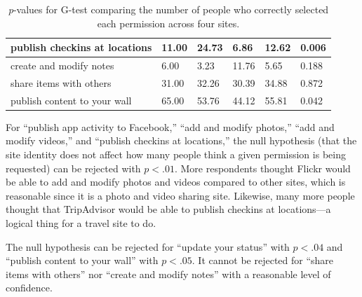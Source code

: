 \documentclass[10pt]{sig-alternate-10pt}
\begin{document}
\begin{table}[htpb]
\begin{tabular}{|l|l|l|l|l|l|}
    publish checkins at locations        & 11.00                                                          & 24.73                                                           & 6.86                                                         & 12.62                                                      & 0.006                             \\ \hline
    create and modify notes              & 6.00                                                           & 3.23                                                            & 11.76                                                        & 5.65                                                       & 0.188                             \\ \hline
    share items with others              & 31.00                                                          & 32.26                                                           & 30.39                                                        & 34.88                                                      & 0.872                             \\ \hline
    publish content to your wall         & 65.00                                                          & 53.76                                                           & 44.12                                                        & 55.81                                                      & 0.042                             \\ \hline
  \end{tabular}
  \caption{\emph{p}-values for G-test comparing the number of people who correctly selected each permission across four sites.}
  \label{table:multistats}
\end{table}

For ``publish app activity to Facebook,'' ``add and modify photos,'' ``add and modify videos,'' and ``publish checkins at locations,'' the null hypothesis (that the site identity does not affect how many people think a given permission is being requested) can be rejected with $p < .01$. More respondents thought Flickr would be able to add and modify photos and videos compared to other sites, which is reasonable since it is a photo and video sharing site. Likewise, many more people thought that TripAdvisor would be able to publish checkins at locations---a logical thing for a travel site to do.

The null hypothesis can be rejected for ``update your status'' with $p < .04$ and ``publish content to your wall'' with $p < .05$. It cannot be rejected for ``share items with others'' nor ``create and modify notes'' with a reasonable level of confidence.
\end{document}
